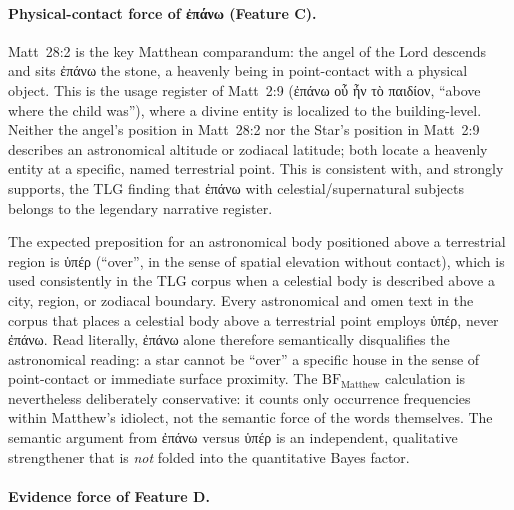 \documentclass[11pt,a4paper]{article}
\newcommand{\grk}[1]{{\fontencoding{LGR}\selectfont #1}}
\newcommand{\grk}[1]{{\greekfont #1}}
\begin{document}
\paragraph{Physical-contact force of \grk{ἐπάνω} (Feature C).}

Matt~28:2 is the key Matthean comparandum: the angel of the Lord descends and
sits \grk{ἐπάνω} the stone, a heavenly being in point-contact with a physical
object. This is the usage register of Matt~2:9 (\grk{ἐπάνω οὗ ἦν τὸ παιδίον},
``above where the child was''), where a divine entity is localized to the
building-level. Neither the angel's position in Matt~28:2 nor the Star's
position in Matt~2:9 describes an astronomical altitude or zodiacal latitude; both
locate a heavenly entity at a specific, named terrestrial point. This is
consistent with, and strongly supports, the TLG finding that \grk{ἐπάνω} with
celestial/supernatural subjects belongs to the legendary narrative register.

The expected preposition for an astronomical body positioned above a terrestrial
region is \grk{ὑπέρ} (``over'', in the sense of spatial elevation without
contact), which is used consistently in the TLG corpus when a celestial body is
described above a city, region, or zodiacal boundary.
Every astronomical and omen text in the corpus that places a celestial body
above a terrestrial point employs \grk{ὑπέρ}, never \grk{ἐπάνω}.
Read literally, \grk{ἐπάνω} alone therefore semantically disqualifies the
astronomical reading: a star cannot be ``over'' a specific house in the sense of
point-contact or immediate surface proximity.
The $\mathrm{BF}_\text{Matthew}$ calculation is nevertheless deliberately
conservative: it counts only occurrence frequencies within Matthew's idiolect,
not the semantic force of the words themselves.
The semantic argument from \grk{ἐπάνω} versus \grk{ὑπέρ} is an independent,
qualitative strengthener that is \emph{not} folded into the quantitative
Bayes factor.

\paragraph{Evidence force of Feature D.}
\end{document}
